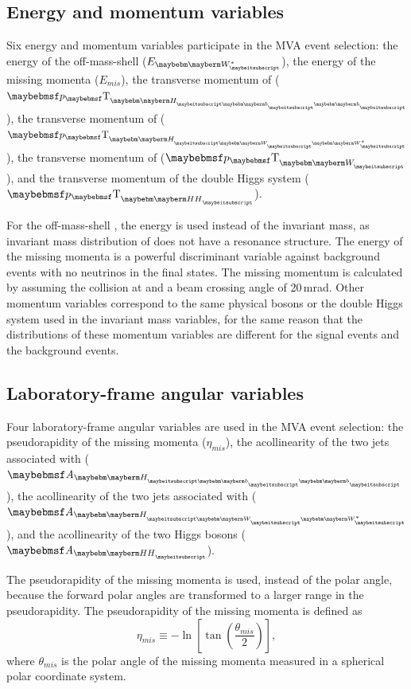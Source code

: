 \subsection{Energy and momentum variables}

Six energy and momentum variables participate in the MVA event selection: the energy of the off-mass-shell \PW ($E_{\W*}$), the energy of the missing momenta ($E_{mis}$), the transverse momentum of \Hbb ($\pT_{\Hbb}$), the transverse momentum of \HWW ($\pT_{\HWW}$), the transverse momentum of \PW ($\pT_{\PW}$), and the transverse momentum of the double Higgs system ($\pT_{\HH}$).

For the off-mass-shell \PW, the energy  is used instead of the invariant mass, as invariant mass distribution of \W* does not have a resonance structure. The energy of the missing momenta is a powerful discriminant variable against background events with no neutrinos in the final states. The missing momentum is calculated by assuming the collision at \sqrtS and a beam crossing angle of 20\,mrad. Other momentum variables correspond to the same physical bosons or the double Higgs system used in  the invariant mass  variables, for the same reason that the distributions of these momentum variables are different for the signal events and the background events.


\subsection{Laboratory-frame angular variables}

Four laboratory-frame angular variables are used in the MVA event selection: the pseudorapidity of the missing momenta ($\eta_{mis}$), the  acollinearity of the two jets associated with \Hbb ($\acolinearity{\Hbb}$),  the  acollinearity of the two jets associated with \HWW ($\acolinearity{\HWW}$), and the  acollinearity of the two Higgs bosons ($\acolinearity{\HH}$).

The pseudorapidity   of the missing momenta is used, instead of the polar angle, because the forward polar angles are transformed to a larger range in the pseudorapidity. The pseudorapidity of the missing momenta is defined as
\begin{equation}
\eta_{mis} \equiv  - \ln \left[ \tan \left( \frac{\theta_{mis}}{2} \right) \right],
\end{equation}
where $\theta_{mis}$ is the polar angle of the missing momenta measured in a spherical polar coordinate system.


